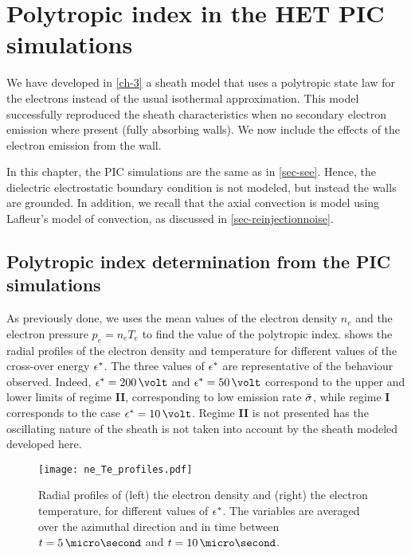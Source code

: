 

\section{Polytropic index in the \ac{HET} \ac{PIC} simulations}
\label{sec-PIC_poly}

We have developed in \cref{ch-3} a sheath model that uses a polytropic state law for the electrons instead of the usual isothermal approximation.
This model successfully reproduced the sheath characteristics  when no secondary electron emission where present (fully absorbing walls).
We now include the effects of the electron emission from the wall.

In this chapter, the \ac{PIC} simulations are the same as in \cref{sec-see}. 
Hence, the dielectric electrostatic boundary condition is not modeled, but instead the walls are grounded.
In addition, we recall that the axial convection is model using Lafleur's model of convection, as discussed in \cref{sec-reinjectionnoise}.

\subsection{Polytropic index determination from the PIC simulations} \label{subsec-fluid_see_polyfit}

As previously done, we uses the mean values of the electron density $n_e$ and the electron pressure $ p_e = n_e T_e$ to find the value of the polytropic index.
 shows the radial profiles of the electron density and temperature for different values of the cross-over energy $\epsilon^{*}$.
The three values of $\epsilon^{*}$ are representative of the behaviour observed.
Indeed, $\crover=200\,\volt$ and $\crover=50\,\volt$ correspond to the upper and lower limits of regime {\bf II}, corresponding to low emission rate $ \bar{\sigma }$, while regime {\bf I} corresponds to the case $\crover=10\,\volt$.
Regime {\bf II} is not presented has the oscillating nature of the sheath is not taken into account by the sheath modeled developed here. 


\begin{figure}[hbtp]
  \centering
  \texttt{[image: ne\_Te\_profiles.pdf]}
  \caption{Radial profiles of (left) the electron density and (right) the electron temperature, for different values of $\epsilon^{*}$. The variables are averaged over the azimuthal direction and in time between $t=5\,\micro\second$ and $t=10\,\micro\second$.  }
  \label{fig-radial_profiles_see}
\end{figure}

